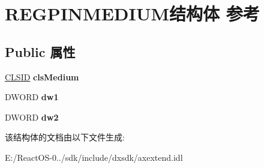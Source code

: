 \hypertarget{struct_r_e_g_p_i_n_m_e_d_i_u_m}{}\section{R\+E\+G\+P\+I\+N\+M\+E\+D\+I\+U\+M结构体 参考}
\label{struct_r_e_g_p_i_n_m_e_d_i_u_m}
\subsection*{Public 属性}
\begin{DoxyCompactItemize}
\item 
\mbox{\label{struct_r_e_g_p_i_n_m_e_d_i_u_m_a4555704d8468fb2ffa040d1e50fd9df4}} 
\hyperlink{struct___i_i_d}{C\+L\+S\+ID} {\bfseries cls\+Medium}
\item 
\mbox{\label{struct_r_e_g_p_i_n_m_e_d_i_u_m_a931b9db51ad869f1732cacdff2aac5ac}} 
D\+W\+O\+RD {\bfseries dw1}
\item 
\mbox{\label{struct_r_e_g_p_i_n_m_e_d_i_u_m_ad047efc3c59546b3ff84f6b0d242d871}} 
D\+W\+O\+RD {\bfseries dw2}
\end{DoxyCompactItemize}


该结构体的文档由以下文件生成\+:\begin{DoxyCompactItemize}
\item 
E\+:/\+React\+O\+S-\/0../sdk/include/dxsdk/axextend.\+idl\end{DoxyCompactItemize}

